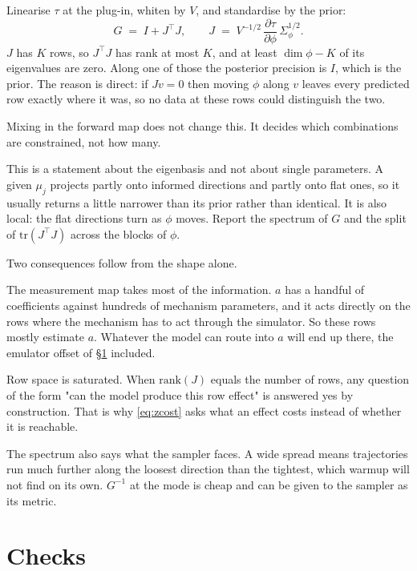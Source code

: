 \documentclass[11pt]{article}
\newcommand{\Tr}{^{\!\top}}
\begin{document}
Linearise $\tau$ at the plug-in, whiten by $V$, and standardise by the prior:
\begin{equation}
G \;=\; I + J\Tr J,
\qquad
J \;=\; V^{-1/2}\,\frac{\partial\tau}{\partial\phi}\,\Sigma_\phi^{1/2} .
\label{eq:ginfo}
\end{equation}
$J$ has $K$ rows, so $J\Tr J$ has rank at most $K$, and at least $\dim\phi - K$
of its eigenvalues are zero. Along one of those the posterior precision is $I$,
which is the prior. The reason is direct: if $Jv=0$ then moving $\phi$ along $v$
leaves every predicted row exactly where it was, so no data at these rows could
distinguish the two.

Mixing in the forward map does not change this. It decides which combinations
are constrained, not how many.

This is a statement about the eigenbasis and not about single parameters. A given
$\mu_j$ projects partly onto informed directions and partly onto flat ones, so it
usually returns a little narrower than its prior rather than identical. It is
also local: the flat directions turn as $\phi$ moves. Report the spectrum of $G$
and the split of $\mathrm{tr}(J\Tr J)$ across the blocks of $\phi$.

Two consequences follow from the shape alone.

The measurement map takes most of the information. $a$ has a handful of
coefficients against hundreds of mechanism parameters, and it acts directly on
the rows where the mechanism has to act through the simulator. So these rows
mostly estimate $a$. Whatever the model can route into $a$ will end up there, the
emulator offset of \S\ref{sec:checks} included.

Row space is saturated. When $\mathrm{rank}(J)$ equals the number of rows, any
question of the form "can the model produce this row effect" is answered yes by
construction. That is why \eqref{eq:zcost} asks what an effect costs instead of
whether it is reachable.

The spectrum also says what the sampler faces. A wide spread means trajectories
run much further along the loosest direction than the tightest, which warmup will
not find on its own. $G^{-1}$ at the mode is cheap and can be given to the
sampler as its metric.

\section{Checks}
\label{sec:checks}
\end{document}
